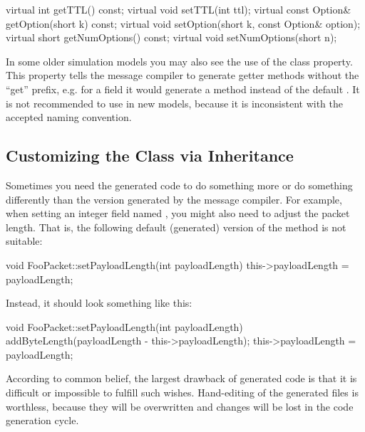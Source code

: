 \begin{cpp}
virtual int getTTL() const;
virtual void setTTL(int ttl);
virtual const Option& getOption(short k) const;
virtual void setOption(short k, const Option& option);
virtual short getNumOptions() const;
virtual void setNumOptions(short n);
\end{cpp}

In some older simulation models you may also see the use of the
 class property. This property tells the message
compiler to generate getter methods without the ``get'' prefix, e.g. for a
 field it would generate a  method
instead of the default . It is not recommended to
use  in new models, because it is inconsistent with the
accepted naming convention.



\subsection{Customizing the Class via Inheritance}
\label{sec:msg-defs:customizing-via-inheritance}

Sometimes you need the generated code to do something
more or do something differently than the version generated
by the message compiler.
For example, when setting an integer field named ,
you might also need to adjust the packet length. That is,
the following default (generated) version of the
 method is not suitable:

\begin{cpp}
void FooPacket::setPayloadLength(int payloadLength)
{
    this->payloadLength = payloadLength;
}
\end{cpp}

Instead, it should look something like this:

\begin{cpp}
void FooPacket::setPayloadLength(int payloadLength)
{
    addByteLength(payloadLength - this->payloadLength);
    this->payloadLength = payloadLength;
}
\end{cpp}

According to common belief, the largest drawback of generated code
is that it is difficult or impossible to fulfill such wishes.
Hand-editing of the generated files is worthless, because
they will be overwritten and changes will be lost
in the code generation cycle.

